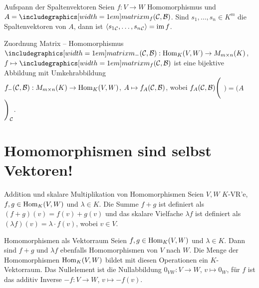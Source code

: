 \begin{Satz}{Aufspann der Spaltenvektoren}
    Seien $f: V \rightarrow W$ Homomorphismus und $A = \hommatrix{f}{C}{B}$.
    Sind $s_1, \ldots, s_n \in K^m$ die Spaltenvektoren von $A$, dann ist
    $\langle {s_1}_{\mathcal{C}}, \ldots, {s_n}_{\mathcal{C}} \rangle = \operatorname{im} f$.
\end{Satz}

\begin{Satz}{Zuordnung Matrix -- Homomorphismus}
    $\hommatrix{-}{C}{B}: \Hom_K(V, W) \rightarrow M_{m \times n}(K)$, \\
    $f \mapsto \hommatrix{f}{C}{B}$ ist eine bijektive Abbildung mit
    Umkehrabbildung \\
    $f_-(\mathcal{C}, \mathcal{B}): M_{m \times n}(K) \rightarrow \operatorname{Hom}_K(V, W)$,
    $A \mapsto f_A(\mathcal{C}, \mathcal{B})$, wobei
    $f_A(\mathcal{C}, \mathcal{B})\Bigg($%
    $\Bigg) = \Bigg(A$%
    $\Bigg)_{\mathcal{C}}$.
\end{Satz}

\section{%
    Homomorphismen sind selbst Vektoren!%
}

\begin{Def}{Addition und skalare Multiplikation von Homomorphismen}
    Seien $V, W$ $K$-VR'e, $f, g \in \operatorname{Hom}_K(V, W)$ und $\lambda \in K$.
    Die Summe $f + g$ ist definiert als
    $(f + g)(v) = f(v) + g(v)$ und das skalare Vielfache $\lambda f$ ist
    definiert als $(\lambda f)(v) = \lambda \cdot f(v)$,
    wobei $v \in V$.
\end{Def}

\begin{Satz}{Homomorphismen als Vektorraum}
    Seien $f, g \in \operatorname{Hom}_K(V, W)$ und $\lambda \in K$.
    Dann sind $f + g$ und $\lambda f$ ebenfalls Homomorphismen
    von $V$ nach $W$.
    Die Menge der Homomorphismen $\operatorname{Hom}_K(V, W)$ bildet mit diesen
    Operationen ein $K$-Vektorraum.
    Das Nullelement ist die Null\-abbildung
    $0_{VW}: V \rightarrow W$, $v \mapsto 0_W$, für $f$ ist das additiv Inverse
    $-f: V \rightarrow W$, $v \mapsto -f(v)$.
\end{Satz}

